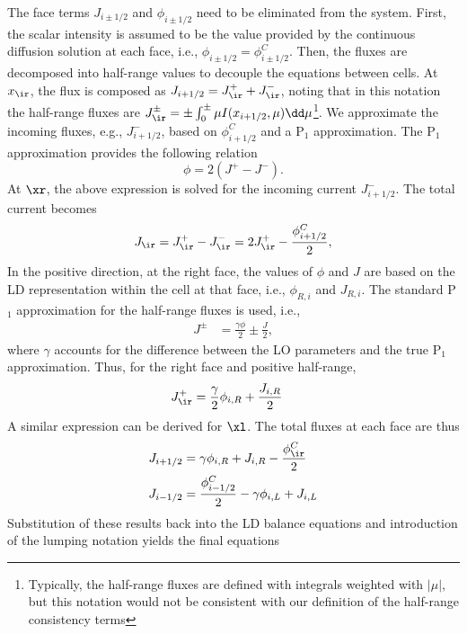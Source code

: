 The face terms $J_{i\pm 1/2}$ and $\phi_{i\pm 1/2}$ need to be eliminated from the
system. First, the scalar intensity is assumed to be the value provided by the continuous
diffusion solution at each face, i.e., $\phi_{i\pm1/2} = \phi_{i\pm1/2}^C$.
Then, the fluxes are decomposed into half-range values to decouple the equations
between cells.  At $x_{\ir}$, the flux is composed as $J_{i+1/2} = J_{\ir}^+ + J_{\ir}^-$,
noting that in this notation the half-range fluxes are $J_{\ir}^{\pm}=\pm \int_{0}^\pm
\mu I(x_{i+1/2},\mu) \dd \mu$\footnote{Typically, the half-range fluxes are defined with
    integrals weighted with $| \mu |$, but this notation would not be consistent with our
definition of the half-range consistency terms}.  We approximate the incoming fluxes, e.g.,
$J_{i+1/2}^-$, based on $\phi_{i+1/2}^C$ and a P$_1$ approximation.   
The P$_1$ approximation provides the following relation~\cite{wla_thesis}
\begin{equation}
    \phi = 2(J^+ - J^-).
\end{equation}
At $\xr$, the above expression is solved for the incoming current $J_{i+1/2}^-$.  The
total current becomes
\begin{equation}\label{eq:jelim}
    J_{\ir} = J_{\ir}^+ - J_{\ir}^- = 2J_{\ir}^+ - \frac{\phi_{i+1/2}^C}{2},
\end{equation}
In the positive direction, at the right face, the
values of $\phi$ and $J$ are based on the LD representation within the cell at that
face, i.e., $\phi_{R,i}$ and $J_{R,i}$.  The standard P$_1$ approximation for the
half-range fluxes is used\cite{stacy}, i.e.,
\begin{align}
    J^{\pm} &= \frac{\gamma \phi}{2} \pm \frac{J}{2},
\end{align}
where $\gamma$ accounts for the difference between the LO parameters and the true
P$_1$ approximation. Thus, for the right face and positive half-range,
\begin{align}
    J_{\ir}^+ &= \frac{\gamma}{2}\phi_{i,R} + \frac{J_{i,R}}{2} 
\end{align}
A similar expression can be derived for $\xl$.  The total fluxes at each face are
thus
\begin{align}
    J_{i+1/2} &= \gamma\phi_{i,R} + J_{i,R} - \frac{\phi_{\ir}^C}{2} \\
    J_{i-1/2} &= \frac{\phi_{i-1/2}^C}{2} - \gamma \phi_{i,L} + J_{i,L}
\end{align}
Substitution of these results back into the LD balance equations and introduction of the
lumping notation yields the final equations 
